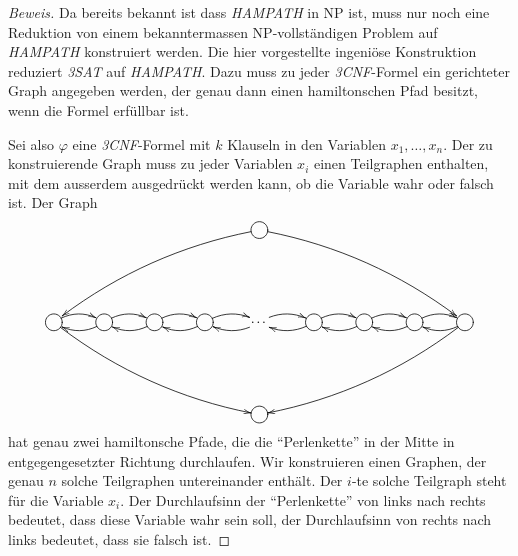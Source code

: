 \begin{proof}[Beweis]
Da bereits bekannt ist dass \textsl{HAMPATH} in NP ist, muss nur
noch eine Reduktion von einem bekanntermassen NP-vollständigen
Problem auf \textsl{HAMPATH} konstruiert werden.
Die hier vorgestellte
ingeniöse Konstruktion reduziert \textsl{3SAT} auf \textsl{HAMPATH}.
Dazu muss zu jeder \textsl{3CNF}-Formel ein gerichteter Graph angegeben
werden, der genau dann einen hamiltonschen Pfad besitzt, wenn die
Formel erfüllbar ist.

Sei also $\varphi$ eine \textsl{3CNF}-Formel mit $k$ Klauseln in den Variablen
$x_1,\dots,x_n$.
Der zu konstruierende Graph muss zu jeder Variablen
$x_i$ einen Teilgraphen enthalten, mit dem ausserdem ausgedrückt
werden kann, ob die Variable wahr oder falsch ist.
Der Graph
\[
\entrymodifiers={++[o][F]}
\xymatrix{
*+\txt{}
	&*+\txt{}
		&*+\txt{}
			&*+\txt{}
				&{} \ar@/_10pt/[ddllll]\ar@/^10pt/[ddrrrr]
					&*+\txt{}
						&*+\txt{}
							&*+\txt{}
								&*+\txt{}
\\
*+\txt{}
\\
{}\ar@/^/[r] \ar@/_10pt/[ddrrrr]
	&{}\ar@/^/[r] \ar@/^/[l]
		&{}\ar@/^/[r] \ar@/^/[l]
			&{}\ar@/^/[r] \ar@/^/[l]
				&*+\txt{\dots}\ar@/^/[r] \ar@/^/[l]
					&{}\ar@/^/[r] \ar@/^/[l]
						&{}\ar@/^/[r] \ar@/^/[l]
							&{}\ar@/^/[r] \ar@/^/[l]
								&{} \ar@/^/[l]\ar@/^10pt/[ddllll]
\\	
*+\txt{}
\\
*+\txt{}
	&*+\txt{}
		&*+\txt{}
			&*+\txt{}
				&{}
					&*+\txt{}
						&*+\txt{}
							&*+\txt{}
								&*+\txt{}
}
\]
hat genau zwei hamiltonsche Pfade, die die ``Perlenkette'' in der
Mitte in entgegengesetzter Richtung durchlaufen.
Wir konstruieren einen Graphen, der
genau $n$ solche Teilgraphen untereinander enthält.
Der $i$-te solche Teilgraph steht für die Variable $x_i$.
Der Durchlaufsinn der ``Perlenkette''
von links nach rechts bedeutet, dass diese Variable wahr sein soll,
der Durchlaufsinn von rechts nach links bedeutet, dass sie falsch ist.


\end{proof}
